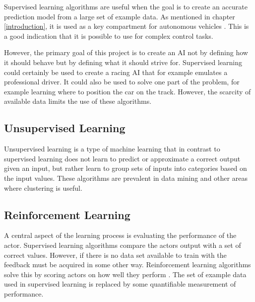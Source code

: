 Supervised learning algorithms are useful when the goal is to create an accurate prediction model from a large set of example data. As mentioned in chapter \ref{introduction}, it is used as a key compartment for autonomous vehicles \cite{?}. This is a good indication that it is possible to use for complex control tasks.

However, the primary goal of this project is to create an AI not by defining how it should behave but by defining what it should strive for. Supervised learning could certainly be used to create a racing AI that for example emulates a professional driver. It could also be used to solve one part of the problem, for example learning where to position the car on the track. However, the scarcity of available data limits the use of these algorithms.  



\subsection{Unsupervised Learning}
Unsupervised learning is a type of machine learning that in contrast to supervised learning does not learn to predict or approximate a correct output given an input, but rather learn to group sets of inputs into categories based on the input values. These algorithms are prevalent in data mining and other areas where clustering is useful. 



\subsection{Reinforcement Learning}
\label{theory:reinforcement_learning}
A central aspect of the learning process is evaluating the performance of the actor. Supervised learning algorithms compare the actors output with a set of correct values. However, if there is no data set available to train with the feedback must be acquired in some other way. Reinforcement learning algorithms solve this by scoring actors on how well they perform \cite{whiteson}. The set of example data used in supervised learning is replaced by some quantifiable measurement of performance.



